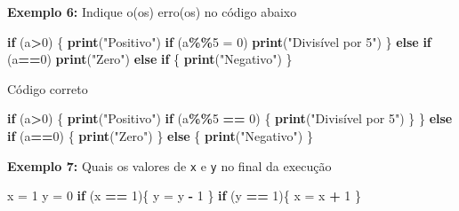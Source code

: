 \documentclass[
]{book}
\newenvironment{Shaded}{\begin{snugshade}}{\end{snugshade}}
\newcommand{\ControlFlowTok}[1]{\textcolor[rgb]{0.13,0.29,0.53}{\textbf{#1}}}
\newcommand{\DecValTok}[1]{\textcolor[rgb]{0.00,0.00,0.81}{#1}}
\newcommand{\FunctionTok}[1]{\textcolor[rgb]{0.13,0.29,0.53}{\textbf{#1}}}
\newcommand{\NormalTok}[1]{#1}
\newcommand{\OtherTok}[1]{\textcolor[rgb]{0.56,0.35,0.01}{#1}}
\newcommand{\SpecialCharTok}[1]{\textcolor[rgb]{0.81,0.36,0.00}{\textbf{#1}}}
\newcommand{\StringTok}[1]{\textcolor[rgb]{0.31,0.60,0.02}{#1}}
\theoremstyle{definition}
\theoremstyle{definition}
\theoremstyle{definition}
\theoremstyle{definition}
\theoremstyle{remark}
\begin{document}
\textbf{Exemplo 6:} Indique o(os) erro(os) no código abaixo

\begin{Shaded}
\begin{Highlighting}[]
\ControlFlowTok{if}\NormalTok{ (a}\SpecialCharTok{\textgreater{}}\DecValTok{0}\NormalTok{) \{  }
  \FunctionTok{print}\NormalTok{(}\StringTok{"Positivo"}\NormalTok{)  }
  \ControlFlowTok{if}\NormalTok{ (a}\SpecialCharTok{\%\%}\DecValTok{5} \OtherTok{=} \DecValTok{0}\NormalTok{)     }
    \FunctionTok{print}\NormalTok{(}\StringTok{"Divisível por 5"}\NormalTok{)    }
\NormalTok{\} }\ControlFlowTok{else} \ControlFlowTok{if}\NormalTok{ (a}\SpecialCharTok{==}\DecValTok{0}\NormalTok{)   }
    \FunctionTok{print}\NormalTok{(}\StringTok{"Zero"}\NormalTok{)}
  \ControlFlowTok{else} \ControlFlowTok{if}\NormalTok{ \{  }
    \FunctionTok{print}\NormalTok{(}\StringTok{"Negativo"}\NormalTok{)}
\NormalTok{\}}
\end{Highlighting}
\end{Shaded}

Código correto

\begin{Shaded}
\begin{Highlighting}[]
\ControlFlowTok{if}\NormalTok{ (a}\SpecialCharTok{\textgreater{}}\DecValTok{0}\NormalTok{) \{  }
  \FunctionTok{print}\NormalTok{(}\StringTok{"Positivo"}\NormalTok{)  }
  \ControlFlowTok{if}\NormalTok{ (a}\SpecialCharTok{\%\%}\DecValTok{5} \SpecialCharTok{==} \DecValTok{0}\NormalTok{) \{    }
    \FunctionTok{print}\NormalTok{(}\StringTok{"Divisível por 5"}\NormalTok{)  }
\NormalTok{  \}}
\NormalTok{\} }\ControlFlowTok{else} \ControlFlowTok{if}\NormalTok{ (a}\SpecialCharTok{==}\DecValTok{0}\NormalTok{) \{  }
    \FunctionTok{print}\NormalTok{(}\StringTok{"Zero"}\NormalTok{)}
\NormalTok{\} }\ControlFlowTok{else}\NormalTok{ \{  }
    \FunctionTok{print}\NormalTok{(}\StringTok{"Negativo"}\NormalTok{)}
\NormalTok{\}}
\end{Highlighting}
\end{Shaded}

\textbf{Exemplo 7:} Quais os valores de \texttt{x} e \texttt{y} no final da execução

\begin{Shaded}
\begin{Highlighting}[]
\NormalTok{x }\OtherTok{=} \DecValTok{1}
\NormalTok{y }\OtherTok{=} \DecValTok{0}
\ControlFlowTok{if}\NormalTok{ (x }\SpecialCharTok{==} \DecValTok{1}\NormalTok{)\{  }
\NormalTok{  y }\OtherTok{=}\NormalTok{ y }\SpecialCharTok{{-}} \DecValTok{1}
\NormalTok{\}}
\ControlFlowTok{if}\NormalTok{ (y }\SpecialCharTok{==} \DecValTok{1}\NormalTok{)\{  }
\NormalTok{  x }\OtherTok{=}\NormalTok{ x }\SpecialCharTok{+} \DecValTok{1}
\NormalTok{\}}
\end{Highlighting}
\end{Shaded}
\end{document}
